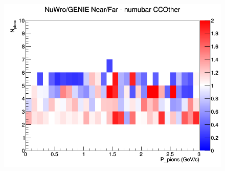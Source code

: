 \documentclass[12pt]{article}
\begin{document}
\begin{figure}[h]
\endminipage
{}
\includegraphics[width=\linewidth]{N_P/nominal/pions/ratios/CCOther_NuWro_GENIE_numubar_NF_N_P.png}
\endminipage
\newline
\end{figure}
\clearpage
\end{document}
